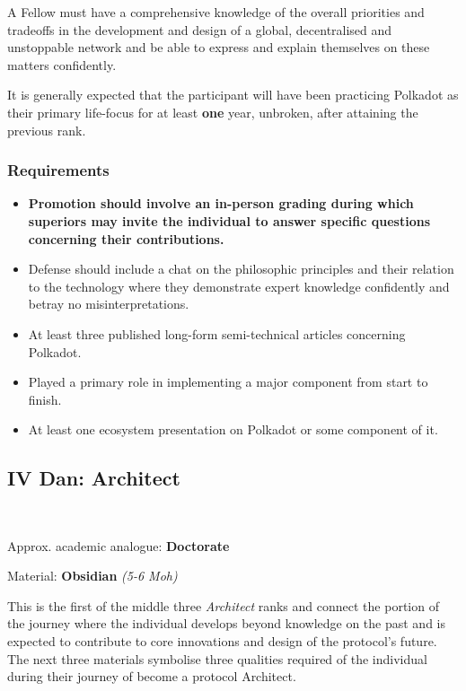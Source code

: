 \documentclass[9pt,oneside]{amsart}
\begin{document}
A Fellow must have a comprehensive knowledge of the overall priorities and tradeoffs in the development and design of a global, decentralised and unstoppable network and be able to express and explain themselves on these matters confidently.

It is generally expected that the participant will have been practicing Polkadot as their primary life-focus for at least \textbf{one} year, unbroken, after attaining the previous rank.

\subsubsection{Requirements}\label{requirements-2}

\begin{itemize}
\item \textbf{Promotion should involve an in-person grading during which superiors may invite the individual to answer specific questions concerning their contributions.}
\item Defense should include a chat on the philosophic principles and their relation to the technology where they demonstrate expert knowledge confidently and betray no misinterpretations.
\item At least three published long-form semi-technical articles concerning Polkadot.
\item Played a primary role in implementing a major component from start to finish.
\item At least one ecosystem presentation on Polkadot or some component of it.
\end{itemize}

\subsection{IV Dan: Architect}\label{iv-dan-architect}~\\


Approx. academic analogue: \textbf{Doctorate}

Material: \textbf{Obsidian} \emph{(5-6 Moh)}

This is the first of the middle three \emph{Architect} ranks and connect the portion of the journey where the individual develops beyond knowledge on the past and is expected to contribute to core innovations and design of the protocol's future. The next three materials symbolise three qualities required of the individual during their journey of become a protocol Architect.
\end{document}
